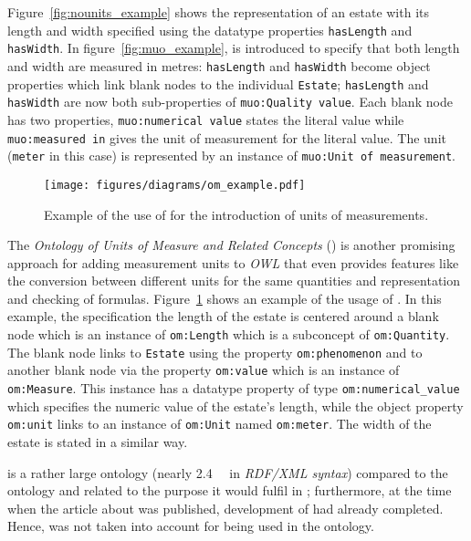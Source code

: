 Figure~\ref{fig:nounits_example} shows the representation of an estate with its length and width specified using the datatype properties \texttt{hasLength} and \texttt{hasWidth}. In figure~\ref{fig:muo_example}, \muo is introduced to specify that both length and width are measured in metres: \texttt{hasLength} and \texttt{hasWidth} become object properties which link blank nodes to the individual \texttt{Estate}; \texttt{hasLength} and \texttt{hasWidth} are now both sub-properties of \texttt{muo:Quality value}. Each blank node has two properties, \texttt{muo:numerical value} states the literal value while \texttt{muo:measured in} gives the unit of measurement for the literal value. The unit (\texttt{meter} in this case) is represented by an instance of \texttt{muo:Unit of measurement}.

\begin{figure}
\centering
\texttt{[image: figures/diagrams/om\_example.pdf]}
\caption{Example of the use of  for the introduction of units of measurements.}
\label{fig:om_example}
\end{figure}

The \emph{Ontology of Units of Measure and Related Concepts} ()\cite{OMWeb,OM} is another promising approach for adding measurement units to \emph{OWL} that even provides features like the conversion between different units for the same quantities and representation and checking of formulas. Figure~\ref{fig:om_example} shows an example of the usage of . In this example, the specification the length of the estate is centered around a blank node which is an instance of \texttt{om:Length} which is a subconcept of \texttt{om:Quantity}. The blank node links to \texttt{Estate} using the property \texttt{om:phenomenon} and to another blank node via the property \texttt{om:value} which is an instance of \texttt{om:Measure}. This instance has a datatype property of type \texttt{om:numerical\_value} which specifies the numeric value of the estate's length, while the object property \texttt{om:unit}
links to an instance of \texttt{om:Unit} named \texttt{om:meter}. The width of the estate is stated in a similar way.

 is a rather large ontology (nearly \SI{2.4}{\mebi\byte} in \emph{RDF/XML syntax}) compared to the \smarthomeweather ontology and related to the purpose it would fulfil in \smarthomeweather; furthermore, at the time when the article about  was published, development of \smarthomeweather had already completed. Hence,  was not taken into account for being used in the \smarthomeweather ontology.

